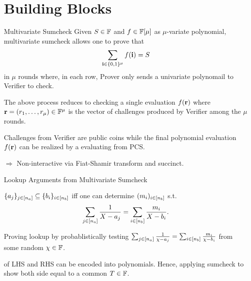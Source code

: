 \section{Building Blocks}
\begin{frame}{Multivariate Sumcheck}
	Given $S \in \mathbb{F}$ and $f \in \mathbb{F}[\mu]$ as $\mu$-variate polynomial, multivariate sumcheck \cite{FOCS:LundFKN90} allows one to prove that 
	\begin{equation*}
		\sum_{\mathbf{i} \in \{0,1\}^\mu} f(\mathbf{i}) = S
	\end{equation*} 
	in $\mu$ rounds where, in each row, Prover only sends a univariate polynomail to Verifier to check.
	
	The above process reduces to checking a single evaluation $f(\mathbf{r})$ where $\mathbf{r} = (r_1, \dots, r_\mu) \in \mathbb{F}^\mu$ is the vector of challenges produced by Verifier among the $\mu$ rounds.
	
	Challenges from Verifier are public coins while the final polynomial evaluation $f(\mathbf{r})$ can be realized by a evaluating from PCS.
	
	$\Rightarrow$ Non-interactive via Fiat-Shamir transform and succinct.
\end{frame}

\begin{frame}{Lookup Arguments from Multivariate Sumcheck}
	\begin{lemma}
		$\{a_j\}_{j \in [{n_a}]} \subseteq \{b_i\}_{i \in [{n_b}]}$ iff one can determine $(m_i)_{i \in [{n_b}]}$ s.t.
		\begin{equation*}
			\sum_{j \in [{n_a}]}\frac{1}{X - a_j} = \sum_{i \in [{n_b}]}\frac{m_i}{X - b_i}.
		\end{equation*}
	\end{lemma}
	
	Proving lookup by probablistically testing $\sum_{j \in [{n_a}]}\frac{1}{\chi - a_j} = \sum_{i \in [{n_b}]}\frac{m_i}{\chi - b_i}$ from some random $\chi \in \mathbb{F}$.
	
	 of LHS and RHS can be encoded into polynomials. Hence, applying sumcheck to show both side equal to a common $T \in \mathbb{F}$.
\end{frame}